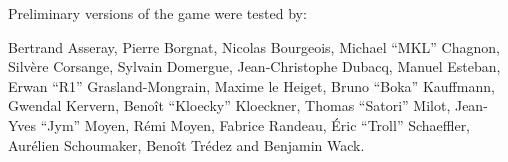 Preliminary versions of the game were tested by:\par
Bertrand Asseray, Pierre Borgnat, Nicolas Bourgeois, Michael ``MKL'' Chagnon,
Silvère Corsange, Sylvain Domergue, Jean-Christophe Dubacq, Manuel Esteban,
Erwan ``R1'' Grasland-Mongrain, Maxime le Heiget, Bruno ``Boka'' Kauffmann,
Gwendal Kervern, Benoît ``Kloecky'' Kloeckner, Thomas ``Satori'' Milot,
Jean-Yves ``Jym'' Moyen, Rémi Moyen, Fabrice Randeau, Éric ``Troll''
Schaeffler, Aurélien Schoumaker, Benoît Trédez and Benjamin Wack.







